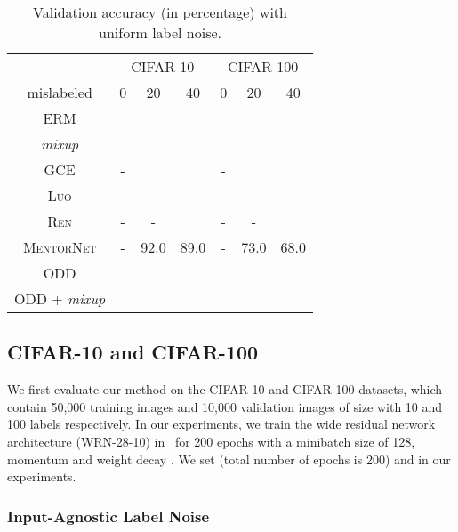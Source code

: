 \documentclass[a4paper,11pt]{article}
\begin{document}
\begin{table*}[htbp]
\begin{center}
\caption{Validation accuracy (in percentage) with uniform label noise.}
\label{tab:cifar-val}
\begin{tabular}{c|ccc|ccc}
\toprule
& \multicolumn{3}{c|}{CIFAR-10} & \multicolumn{3}{c}{CIFAR-100} \\
 mislabeled                                           & 0                              & 20                              & 40                & 0 & 20 & 40             \\\midrule
\textsc{ERM}                                           &  &  &  &   &  &  \\
\textit{mixup}                                                &                &  &   &  &  &   \\
\textsc{GCE}     &  -  &   &   & - &  &  \\
\textsc{Luo} &  &  &  &  &  &  \\
\midrule
\textsc{Ren}   &    -    &    -     &  & - & - &   \\
\textsc{MentorNet} &   -      & 92.0    & 89.0  & - & 73.0 & 68.0 \\\midrule
\textsc{ODD}                              &  &   &  &  &   &     \\
\textsc{ODD} + \textit{mixup}                              &  &   &  &  &   &     \\
\bottomrule                          
\end{tabular}
\end{center}
\end{table*}

\subsection{CIFAR-10 and CIFAR-100}
\label{sec:exp-cifar}
We first evaluate our method on the CIFAR-10 and CIFAR-100 datasets, which contain 50,000 training images and 10,000 validation images of size  with 10 and 100 labels respectively. 
In our experiments, we train the wide residual network architecture (WRN-28-10) in~\cite{zagoruyko2016wide} for 200 epochs with a minibatch size of 128, momentum  and weight decay . We set  (total number of epochs is 200) and  in our experiments.


\subsubsection{Input-Agnostic Label Noise}
\end{document}
